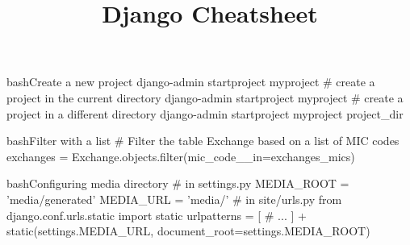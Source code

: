 \documentclass[10pt,a4paper]{article}
\title{\color{w3schools}Django Cheatsheet
}
\begin{document}
\maketitle

\small
\begin{multicols}{3}

\thispagestyle{empty}
\scriptsize



\begin{codebox}{bash}{Create a new project}
django-admin startproject myproject
# create a project in the current directory
django-admin startproject myproject
# create a project in a different directory
django-admin startproject myproject project_dir

\end{codebox}

\begin{codebox}{bash}{Filter with a list}
# Filter the table Exchange based on a list of MIC codes
exchanges = Exchange.objects.filter(mic_code__in=exchanges_mics)

\end{codebox}


\begin{codebox}{bash}{Configuring media directory}
# in settings.py
MEDIA_ROOT = 'media/generated'
MEDIA_URL = 'media/'
# in site/urls.py
from django.conf.urls.static import static
urlpatterns = [
    # ...
] + static(settings.MEDIA_URL, document_root=settings.MEDIA_ROOT)

\end{codebox}


\AtNextBibliography{\footnotesize}
\printbibliography  
\end{multicols}
\end{document}
